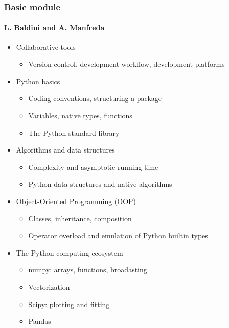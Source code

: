 \documentclass[9pt]{beamer}
\begin{document}
\begin{frame}
  \frametitle{Basic module}
  \framesubtitle{L. Baldini and A. Manfreda}
  \begin{itemize}
  \item Collaborative tools
    \begin{itemize}
    \item Version control, development workflow, development platforms
    \end{itemize}
  \item Python basics
    \begin{itemize}
    \item Coding conventions, structuring a package
    \item Variables, native types, functions
    \item The Python standard library
    \end{itemize}
  \item Algorithms and data structures
    \begin{itemize}
    \item Complexity and asymptotic running time
    \item Python data structures and native algorithms
    \end{itemize}
  \item Object-Oriented Programming (OOP)
    \begin{itemize}
    \item Classes, inheritance, composition
    \item Operator overload and emulation of Python builtin types
    \end{itemize}
  \item The Python computing ecosystem
    \begin{itemize}
    \item numpy: arrays, functions, broadasting
    \item Vectorization
    \item Scipy: plotting and fitting
    \item Pandas
    \end{itemize}
  \end{itemize}
\end{frame}
\end{document}
